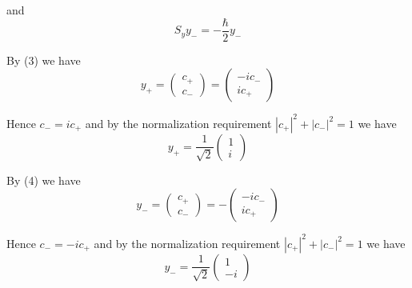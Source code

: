 and
\begin{equation*}
S_yy_-=-\frac{\hbar}{2}y_-
\tag{4}
\end{equation*}

By (3) we have
\begin{equation*}
y_+=\begin{pmatrix}c_+\\c_-\end{pmatrix}=\begin{pmatrix}-ic_-\\ic_+\end{pmatrix}
\end{equation*}

Hence $c_-=ic_+$ and
by the normalization requirement $|c_+|^2+|c_-|^2=1$ we have
\begin{equation*}
y_+=\frac{1}{\sqrt2}\begin{pmatrix}1\\i\end{pmatrix}
\end{equation*}

By (4) we have
\begin{equation*}
y_-=\begin{pmatrix}c_+\\c_-\end{pmatrix}=-\begin{pmatrix}-ic_-\\ic_+\end{pmatrix}
\end{equation*}

Hence $c_-=-ic_+$ and
by the normalization requirement $|c_+|^2+|c_-|^2=1$ we have
\begin{equation*}
y_-=\frac{1}{\sqrt2}\begin{pmatrix}1\\-i\end{pmatrix}
\end{equation*}


